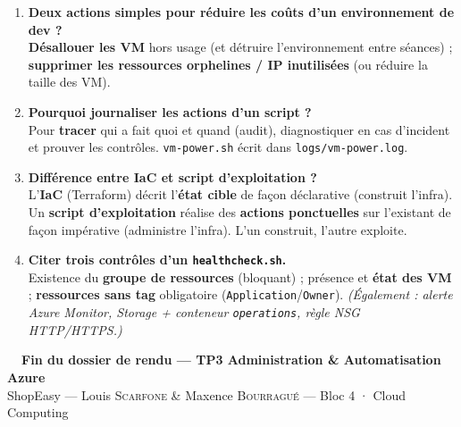 \documentclass[11pt,a4paper]{article}
\newcommand{\emo}[1]{\raisebox{-0.14em}{\twemoji{#1}}}
\newcommand{\eParty}{\emo{1f389}}
\newcommand{\code}[1]{\texttt{#1}}
\begin{document}
\begin{enumerate}[leftmargin=2.2em]
\item \textbf{Deux actions simples pour réduire les coûts d'un environnement de dev ?}\\ \textbf{Désallouer les VM} hors usage (et détruire l'environnement entre séances) ; \textbf{supprimer les ressources orphelines / IP inutilisées} (ou réduire la taille des VM).
\item \textbf{Pourquoi journaliser les actions d'un script ?}\\ Pour \textbf{tracer} qui a fait quoi et quand (audit), diagnostiquer en cas d'incident et prouver les contrôles. \code{vm-power.sh} écrit dans \code{logs/vm-power.log}.
\item \textbf{Différence entre IaC et script d'exploitation ?}\\ L'\textbf{IaC} (Terraform) décrit l'\textbf{état cible} de façon déclarative (construit l'infra). Un \textbf{script d'exploitation} réalise des \textbf{actions ponctuelles} sur l'existant de façon impérative (administre l'infra). L'un construit, l'autre exploite.
\item \textbf{Citer trois contrôles d'un \code{healthcheck.sh}.}\\ Existence du \textbf{groupe de ressources} (bloquant) ; présence et \textbf{état des VM} ; \textbf{ressources sans tag} obligatoire (\code{Application}/\code{Owner}). \textit{(Également : alerte Azure Monitor, Storage + conteneur \code{operations}, règle NSG HTTP/HTTPS.)}
\end{enumerate}

\vspace{6mm}
\begin{center}
{\sffamily\bfseries\large\color{azuredark}\eParty~~Fin du dossier de rendu — TP3 Administration \& Automatisation Azure}\\[2mm]
{\color{black!55}ShopEasy — Louis \textsc{Scarfone} \& Maxence \textsc{Bourragué} — Bloc 4 · Cloud Computing}
\end{center}
\end{document}
